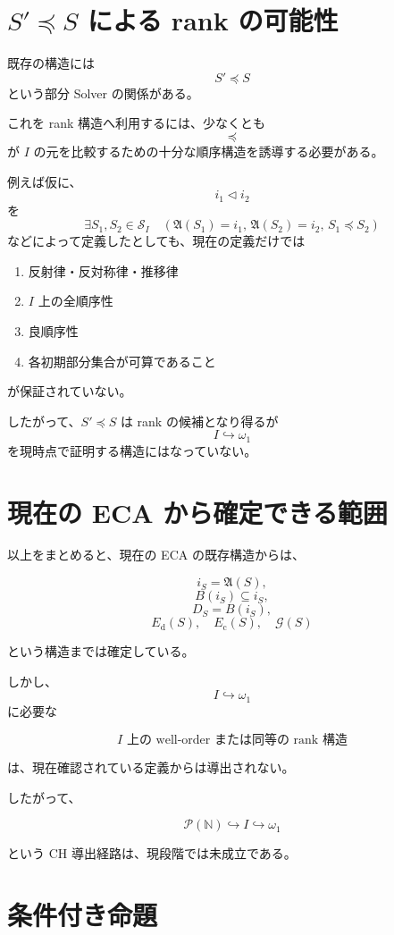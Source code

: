 \documentclass[a4paper,11pt]{article}
\begin{document}
\section{$S'\preceq S$ による rank の可能性}

既存の構造には
\[
S'\preceq S
\]
という部分 Solver の関係がある。

これを rank 構造へ利用するには、少なくとも
\[
\preceq
\]
が $I$ の元を比較するための十分な順序構造を誘導する必要がある。

例えば仮に、
\[
i_1\triangleleft i_2
\]
を
\[
\exists S_1,S_2\in\mathcal{S}_I
\quad
\left(
\mathfrak{A}(S_1)=i_1,\,
\mathfrak{A}(S_2)=i_2,\,
S_1\preceq S_2
\right)
\]
などによって定義したとしても、現在の定義だけでは

\begin{enumerate}[label=(\arabic*)]
\item 反射律・反対称律・推移律
\item $I$ 上の全順序性
\item 良順序性
\item 各初期部分集合が可算であること
\end{enumerate}

が保証されていない。

したがって、$S'\preceq S$ は rank の候補となり得るが
\[
I\hookrightarrow\omega_1
\]
を現時点で証明する構造にはなっていない。

\section{現在の ECA から確定できる範囲}

以上をまとめると、現在の ECA の既存構造からは、

\[
i_S=\mathfrak{A}(S),
\]
\[
B(i_S)\subseteq i_S,
\]
\[
D_S=B(i_S),
\]
\[
E_{\mathrm{d}}(S),
\quad
E_{\mathrm{c}}(S),
\quad
\mathcal{G}(S)
\]

という構造までは確定している。

しかし、
\[
I\hookrightarrow\omega_1
\]
に必要な

\[
\boxed{
\text{$I$ 上の well-order または同等の rank 構造}
}
\]

は、現在確認されている定義からは導出されない。

したがって、

\[
\boxed{
\mathcal{P}(\mathbb{N})
\hookrightarrow I
\hookrightarrow\omega_1
}
\]

という CH 導出経路は、現段階では未成立である。

\section{条件付き命題}
\end{document}
